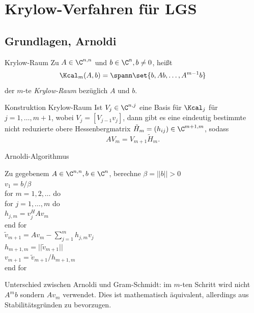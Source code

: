 \section{Krylow-Verfahren für LGS}
\subsection{Grundlagen, Arnoldi}

\begin{karte}{Krylow-Raum}
    Zu \( A\in \C^{n,n} \) und \(b\in \C^n, b\neq 0 \), 
    heißt 
    \[ \Kcal_m(A,b) = \spann\set{b, Ab, \ldots, A^{m-1}b} \]
    der \(m\)-te \textit{Krylow-Raum} bezüglich \(A\) und \(b\).
\end{karte}

\begin{karte}{Konstruktion Krylow-Raum}
    Ist \(V_j \in \C^{n,j}\) eine Basis für \( \Kcal_j \) für \(j = 1,\ldots, m+1\), 
    wobei \( V_j = [V_{j-1} v_j] \), dann gibt es eine eindeutig bestimmte 
    nicht reduzierte obere Hessenbergmatrix \( \tilde{H}_m = (h_{ij}) \in \C^{m+1,m} \), 
    sodass 
    \[ A V_m = V_{m+1} \tilde{H}_m. \]
\end{karte}

\begin{karte}{Arnoldi-Algorithmus}
    \begin{tabbing}
        Zu gegebenem \(A\in \C^{n,n}, b\in \C^n\), berechne \( \beta = ||b||>0 \) \\
        \(v_1 = b/\beta\) \\
        for \= \( m = 1,2,\ldots \) do \\
        \> for \= \(j = 1,\ldots, m \) do \\
        \> \> \( h_{j,m} = v_j^H A v_m \) \\
        \> end for \\
        \> \( \tilde{v}_{m+1} = A v_m - \sum_{j=1}^m h_{j,m} v_j \) \\
        \> \( h_{m+1,m} = ||\tilde{v}_{m+1}|| \) \\
        \> \( v_{m+1} = \tilde{v}_{m+1}/h_{m+1,m} \) \\
        end for
    \end{tabbing}
    Unterschied zwischen Arnoldi und Gram-Schmidt: im \(m\)-ten Schritt wird
    nicht \( A^m b\) sondern \(A v_m\) verwendet. Dies ist mathematisch äquivalent, 
    allerdings aus Stabilitätsgründen zu bevorzugen.
\end{karte}

